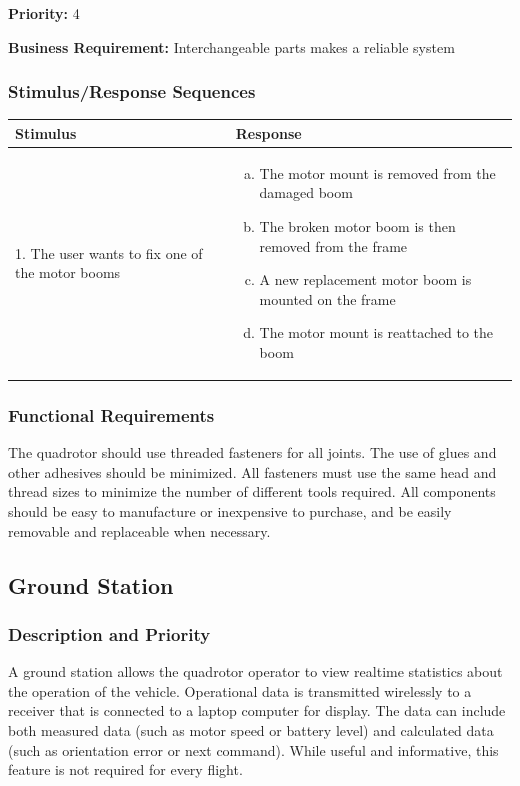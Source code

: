 \documentclass[english]{article}
\numberwithin{equation}{section} %
\begin{document}
\textbf{Priority:} 4

\textbf{Business Requirement:} Interchangeable parts makes a reliable system

\subsubsection{Stimulus/Response Sequences}

\begin{longtable}{p{3cm} | p{8.5cm}}
\hline
\textbf{Stimulus} & \textbf{Response}\\
\hline
1. The user wants to fix one of the motor booms &
\begin{enumerate}[(a)]\itemsep1pt %
\item The motor mount is removed from the damaged boom
\item The broken motor boom is then removed from the frame
\item A new replacement motor boom is mounted on the frame
\item The motor mount is reattached to the boom
\end{enumerate}
\\ 
\hline
\end{longtable}
\subsubsection{Functional Requirements}
The quadrotor should use threaded fasteners for all joints. The use of glues and other adhesives should be minimized. All fasteners must use the same head and thread sizes to minimize the number of different tools required. All components should be easy to manufacture or inexpensive to purchase, and be easily removable and replaceable when necessary.

\bigskip
\subsection{Ground Station}
\subsubsection{Description and Priority}
A ground station allows the quadrotor operator to view realtime statistics about the operation of the vehicle. Operational data is transmitted wirelessly to a receiver that is connected to a laptop computer for display. The data can include both measured data (such as motor speed or battery level) and calculated data (such as orientation error or next command). While useful and informative, this feature is not required for every flight.
\end{document}
